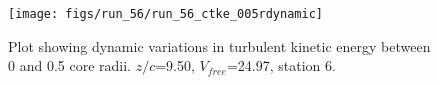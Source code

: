 \begin{figure}[H]
\centering
\texttt{[image: figs/run\_56/run\_56\_ctke\_005rdynamic]}
\caption{Plot showing dynamic variations in turbulent kinetic energy between 0 and 0.5 core radii. $z/c$=9.50, $V_{free}$=24.97, station 6.}
\label{fig:run_56_ctke_005rdynamic}
\end{figure}


